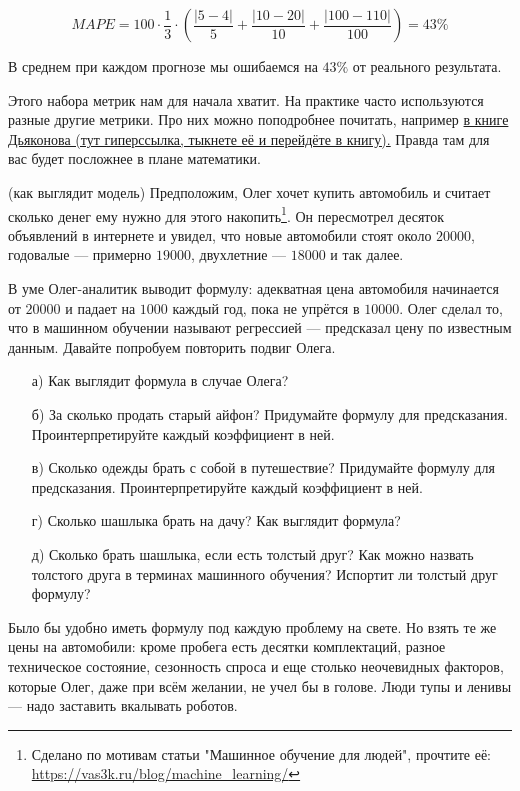 \documentclass[12pt, a4paper, oneside]{article}
\theoremstyle{plain} %
\theoremstyle{definition}
\begin{document}
\begin{solution}
\begin{itemize}
$$
MAPE = 100\cdot \frac{1}{3} \cdot\left( \frac{|5 - 4|}{5} + \frac{|10 -20|}{10} + \frac{|100 - 110|}{100} \right) =  43 \% 
$$

В среднем при каждом прогнозе мы ошибаемся на $43\%$ от реального результата. 

Этого набора метрик нам для начала хватит. На практике часто используются разные другие метрики. Про них можно поподробнее почитать, например \href{https://alexanderdyakonov.files.wordpress.com/2018/10/book_08_metrics_12_blog1.pdf}{в книге Дьяконова (тут гиперссылка, тыкнете её и перейдёте в книгу).} Правда там для вас будет посложнее в плане математики.
\end{itemize} 
\end{solution}


\begin{problem}{(как выглядит модель)}
Предположим, Олег хочет купить автомобиль и считает сколько денег ему нужно для этого накопить\footnote{Сделано по мотивам статьи "Машинное обучение для людей", прочтите её: \url{https://vas3k.ru/blog/machine_learning/}}. Он пересмотрел десяток объявлений в интернете и увидел, что новые автомобили стоят около $20 000$, годовалые — примерно $19 000$, двухлетние — $18 000$ и так далее.

В уме Олег-аналитик выводит формулу: адекватная цена автомобиля начинается от $20 000$ и падает на $1000$ каждый год, пока не упрётся в $10 000$. Олег сделал то, что в машинном обучении называют регрессией --- предсказал цену по известным данным. Давайте попробуем повторить подвиг Олега.

\begin{enumerate}
	\item[а)] Как выглядит формула в случае Олега?
	\item[б)] За сколько продать старый айфон? Придумайте формулу для предсказания. Проинтерпретируйте каждый коэффициент в ней. 
	\item[в)] Сколько одежды брать с собой в путешествие?  Придумайте формулу для предсказания. Проинтерпретируйте каждый коэффициент в ней. 
	\item[г)] Сколько шашлыка брать на дачу? Как выглядит формула?
	\item[д)] Сколько брать шашлыка, если есть толстый друг? Как можно назвать толстого друга в терминах машинного обучения? Испортит ли толстый друг формулу?
\end{enumerate}

Было бы удобно иметь формулу под каждую проблему на свете. Но взять те же цены на автомобили: кроме пробега есть десятки комплектаций, разное техническое состояние, сезонность спроса и еще столько неочевидных факторов, которые Олег, даже при всём желании, не учел бы в голове. Люди тупы и ленивы — надо заставить вкалывать роботов.
\end{problem}
\end{document}
